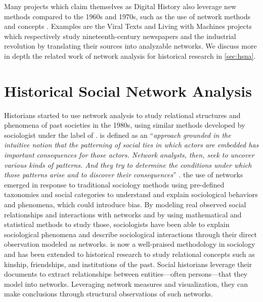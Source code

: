 Many projects which claim themselves as Digital History also leverage new methods compared to the 1960s and 1970s, such as the use of network methods and concepts \cite{ahnertNetworkTurnChanging2020}.
Examples are the Viral Texts \cite{cordell2017viral} and Living with Machines \cite{ardanuyLivingMachinesStudy2020} projects which respectively study nineteenth-century newspapers and the industrial revolution by translating their sources into analyzable networks.
We discuss more in depth the related work of network analysis for historical research in \autoref{sec:hsna}.


\section{Historical Social Network Analysis}\label{sec:hsna}

Historians started to use network analysis to study relational structures and phenomena of past societies in the 1980s, using similar methods developed by sociologist under the label of \sna.
\sna is defined as an ``\textit{approach grounded in the intuitive notion that the patterning of social ties in which actors are embedded has important consequences for those actors. Network analysts, then, seek to uncover various kinds of patterns. And they try to determine the conditions under which those patterns arise and to discover their consequences}'' \cite{freemanDevelopmentSocialNetwork2004}.
the use of networks emerged in response to traditional sociology methods using pre-defined taxonomies and social categories to understand and explain sociological behaviors and phenomena, which could introduce bias.
By modeling real observed social relationships and interactions with networks and by using mathematical and statistical methods to study those, sociologists have been able to explain sociological phenomena and describe sociological interactions through their direct observation modeled as networks.
\sna is now a well-praised methodology in sociology and has been extended to historical research to study relational concepts such as kinship, friendships, and institutions of the past.
Social historians leverage their documents to extract relationships between entities---often persons---that they model into networks.
Leveraging network measures and visualization, they can make conclusions through structural observations of such networks.


